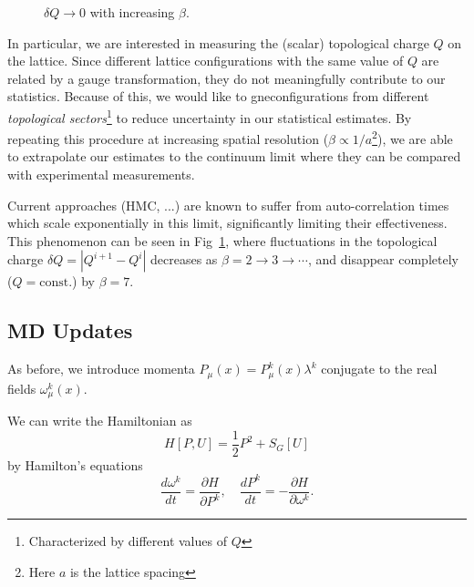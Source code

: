 \documentclass[a4paper,11pt]{article}
\begin{document}
\begin{figure}
  \begin{center}
  \caption{\label{fig:csd}$\delta Q \rightarrow 0$ with increasing $\beta$.}
  
  \end{center}
\end{figure}
%
In particular, we are interested in measuring the (scalar) topological charge $Q$ on the lattice.
%
Since different lattice configurations with the same value of $Q$ are related by a gauge transformation, they do not meaningfully contribute to our statistics.
%
Because of this, we would like to gneconfigurations from different \textit{topological sectors}\footnote{Characterized by different values of $Q$} to reduce uncertainty in our statistical estimates.
%
By repeating this procedure at increasing spatial resolution ($\beta \propto 1 / a$\footnote{Here $a$ is the lattice spacing}), we are able to extrapolate our estimates to the continuum limit where they can be compared with experimental measurements.
%

Current approaches (HMC, ...) are known to suffer from auto-correlation times which scale exponentially in this limit, significantly limiting their effectiveness.
%
This phenomenon can be seen in Fig~\ref{fig:csd}, where fluctuations in the topological charge $\delta Q = |Q^{i + 1} - Q^{i}|$ decreases as $\beta = 2 \rightarrow 3 \rightarrow \cdots$, and disappear completely ($Q = \mathrm{const.}$) by $\beta = 7$.
%
%

\subsection{\label{subsec:hmc-4dSU3}MD Updates}
As before, we introduce momenta $P_{\mu}(x) = P^{k}_{\mu}(x) \lambda^{k}$ conjugate to the real fields $\omega_{\mu}^{k}(x)$.

%
We can write the Hamiltonian as
%
\begin{equation}
    H[P, U] = \frac{1}{2} P^{2} + S_{G}[U]
\end{equation}
%
by Hamilton's equations
%
\begin{equation}
\frac{d\omega^{k}}{dt} = \frac{\partial H}{\partial P^{k}},
\quad \frac{dP^{k}}{dt} = - \frac{\partial H}{\partial \omega^{k}}.
\end{equation}
%
\end{document}
